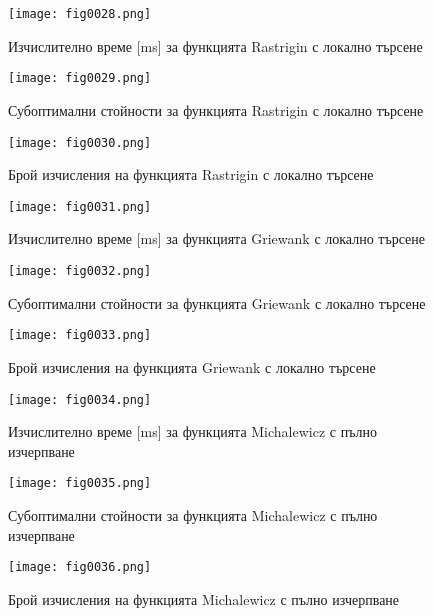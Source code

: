 \begin{figure}[H]
  \centering
  \texttt{[image: fig0028.png]}
  \caption{Изчислително време [ms] за функцията Rastrigin с локално търсене}
\label{fig0028}
\end{figure}

\begin{figure}[H]
  \centering
  \texttt{[image: fig0029.png]}
  \caption{Субоптимални стойности за функцията Rastrigin с локално търсене}
\label{fig0029}
\end{figure}

\begin{figure}[H]
  \centering
  \texttt{[image: fig0030.png]}
  \caption{Брой изчисления на функцията Rastrigin с локално търсене}
\label{fig0030}
\end{figure}

\begin{figure}[H]
  \centering
  \texttt{[image: fig0031.png]}
  \caption{Изчислително време [ms] за функцията Griewank с локално търсене}
\label{fig0031}
\end{figure}

\begin{figure}[H]
  \centering
  \texttt{[image: fig0032.png]}
  \caption{Субоптимални стойности за функцията Griewank с локално търсене}
\label{fig0032}
\end{figure}

\begin{figure}[H]
  \centering
  \texttt{[image: fig0033.png]}
  \caption{Брой изчисления на функцията Griewank с локално търсене}
\label{fig0033}
\end{figure}

\begin{figure}[H]
  \centering
  \texttt{[image: fig0034.png]}
  \caption{Изчислително време [ms] за функцията Michalewicz с пълно изчерпване}
\label{fig0034}
\end{figure}

\begin{figure}[H]
  \centering
  \texttt{[image: fig0035.png]}
  \caption{Субоптимални стойности за функцията Michalewicz с пълно изчерпване}
\label{fig0035}
\end{figure}

\begin{figure}[H]
  \centering
  \texttt{[image: fig0036.png]}
  \caption{Брой изчисления на функцията Michalewicz с пълно изчерпване}
\label{fig0036}
\end{figure}

